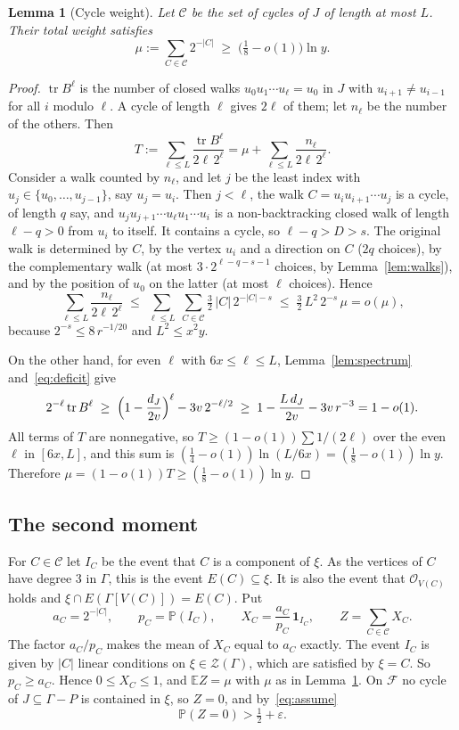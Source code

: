 \documentclass[11pt]{article}
\newtheorem{lemma}[theorem]{Lemma}
\theoremstyle{definition}
\theoremstyle{remark}
\newcommand{\Z}{\mathcal{Z}}
\newcommand{\PP}{\mathbb{P}}
\newcommand{\EE}{\mathbb{E}}
\newcommand{\tr}{\operatorname{tr}}
\newcommand{\cO}{\mathcal{O}}
\numberwithin{equation}{section}
\begin{document}
\begin{lemma}[Cycle weight]\label{lem:weight}
Let $\mathcal{C}$ be the set of cycles of $J$ of length at most $L$. Their total weight satisfies
\[
  \mu:=\sum_{C\in\mathcal{C}}2^{-|C|}\;\ge\;\bigl(\tfrac18-o(1)\bigr)\ln y .
\]
\end{lemma}

\begin{proof}
$\tr B^{\ell}$ is the number of closed walks $u_0u_1\cdots u_\ell=u_0$ in $J$ with
$u_{i+1}\ne u_{i-1}$ for all $i$ modulo $\ell$. A cycle of length $\ell$ gives $2\ell$ of them; let
$n_\ell$ be the number of the others. Then
\[
  T:=\sum_{\ell\le L}\frac{\tr B^{\ell}}{2\ell\,2^{\ell}}=\mu+\sum_{\ell\le L}\frac{n_\ell}{2\ell\,2^{\ell}} .
\]
Consider a walk counted by $n_\ell$, and let $j$ be the least index with
$u_j\in\{u_0,\dots,u_{j-1}\}$, say $u_j=u_i$. Then $j<\ell$, the walk $C=u_iu_{i+1}\cdots u_j$ is a
cycle, of length $q$ say, and $u_ju_{j+1}\cdots u_\ell u_1\cdots u_i$ is a non-backtracking closed
walk of length $\ell-q>0$ from $u_i$ to itself. It contains a cycle, so $\ell-q>D>s$. The original
walk is determined by $C$, by the vertex $u_i$ and a direction on $C$ ($2q$ choices), by the
complementary walk (at most $3\cdot2^{\ell-q-s-1}$ choices, by Lemma~\ref{lem:walks}), and by the
position of $u_0$ on the latter (at most $\ell$ choices). Hence
\[
  \sum_{\ell\le L}\frac{n_\ell}{2\ell\,2^{\ell}}
  \;\le\;\sum_{\ell\le L}\ \sum_{C\in\mathcal{C}}\tfrac32\,|C|\,2^{-|C|-s}
  \;\le\;\tfrac32\,L^{2}\,2^{-s}\,\mu=o(\mu),
\]
because $2^{-s}\le8\,r^{-1/20}$ and $L^{2}\le x^{2}y$.

On the other hand, for even $\ell$ with $6x\le\ell\le L$, Lemma~\ref{lem:spectrum}
and~\eqref{eq:deficit} give
\[
  2^{-\ell}\tr B^{\ell}\;\ge\;\Bigl(1-\frac{d_J}{2v}\Bigr)^{\ell}-3v\,2^{-\ell/2}
  \;\ge\;1-\frac{L\,d_J}{2v}-3v\,r^{-3}=1-o(1).
\]
All terms of $T$ are nonnegative, so $T\ge(1-o(1))\sum1/(2\ell)$ over the even $\ell$ in $[6x,L]$,
and this sum is $(\frac14-o(1))\ln(L/6x)=(\frac18-o(1))\ln y$. Therefore
$\mu=(1-o(1))T\ge(\frac18-o(1))\ln y$.
\end{proof}

\subsection{The second moment}

For $C\in\mathcal{C}$ let $I_C$ be the event that $C$ is a component of $\xi$. As the vertices of
$C$ have degree $3$ in $\Gamma$, this is the event $E(C)\subseteq\xi$. It is also the event that
$\cO_{V(C)}$ holds and $\xi\cap E(\Gamma[V(C)])=E(C)$. Put
\[
  a_C=2^{-|C|},\qquad p_C=\PP(I_C),\qquad X_C=\frac{a_C}{p_C}\,\mathbf{1}_{I_C},\qquad
  Z=\sum_{C\in\mathcal{C}}X_C .
\]
The factor $a_C/p_C$ makes the mean of $X_C$ equal to $a_C$ exactly. The event $I_C$ is given by
$|C|$ linear conditions on $\xi\in\Z(\Gamma)$, which are satisfied by $\xi=C$. So $p_C\ge a_C$.
Hence $0\le X_C\le1$, and $\EE Z=\mu$ with $\mu$ as in Lemma~\ref{lem:weight}. On $\mathcal{F}$
no cycle of $J\subseteq\Gamma-P$ is contained in $\xi$, so $Z=0$, and by~\eqref{eq:assume}
\begin{equation}\label{eq:Zzero}
  \PP(Z=0)>\tfrac12+\varepsilon .
\end{equation}
\end{document}
